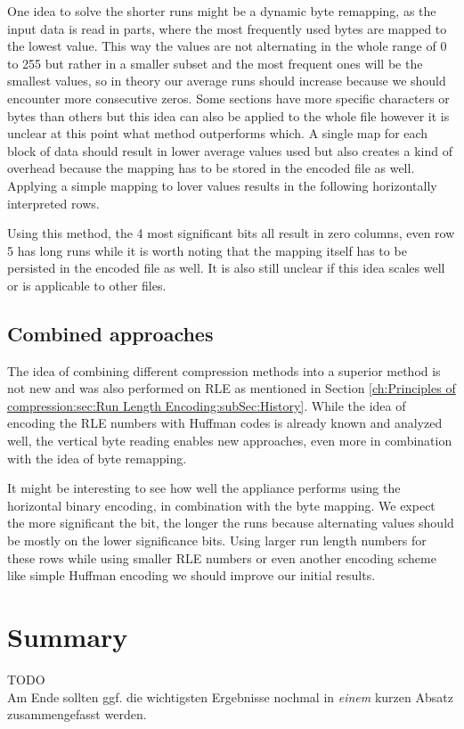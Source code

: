 \par{
One idea to solve the shorter runs might be a dynamic byte remapping, as the input data is read in parts, where the most frequently used bytes are mapped to the lowest value. This way the values are not alternating in the whole range of 0 to 255 but rather in a smaller subset and the most frequent ones will be the smallest values, so in theory our average runs should increase because we should encounter more consecutive zeros. Some sections have more specific characters or bytes than others but this idea can also be applied to the whole file however it is unclear at this point what method outperforms which. A single map for each block of data should result in lower average values used but also creates a kind of overhead because the mapping has to be stored in the encoded file as well. Applying a simple mapping to lover values results in the following horizontally interpreted rows.
}

\par{
\arraydump\dataC

Using this method, the 4 most significant bits all result in zero columns, even row 5 has long runs while it is worth noting that the mapping itself has to be persisted in the encoded file as well. It is also still unclear if this idea scales well or is applicable to other files.
}

\subsection{Combined approaches}
\par{
The idea of combining different compression methods into a superior method is not new and was also performed on RLE as mentioned in Section \ref{ch:Principles of compression:sec:Run Length Encoding:subSec:History}. While the idea of encoding the RLE numbers with Huffman codes is already known and analyzed well, the vertical byte reading enables new approaches, even more in combination with the idea of byte remapping.
}

\par{
It might be interesting to see how well the appliance performs using the horizontal binary encoding, in combination with the byte mapping. We expect the more significant the bit, the longer the runs because alternating values should be mostly on the lower significance bits. Using larger run length numbers for these rows while using smaller RLE numbers or even another encoding scheme like simple Huffman encoding we should improve our initial results.
}


\section{Summary}
\label{ch:Analyse:sec:Summary}

TODO\\

Am Ende sollten ggf. die wichtigsten Ergebnisse nochmal in \emph{einem}
kurzen Absatz zusammengefasst werden.

